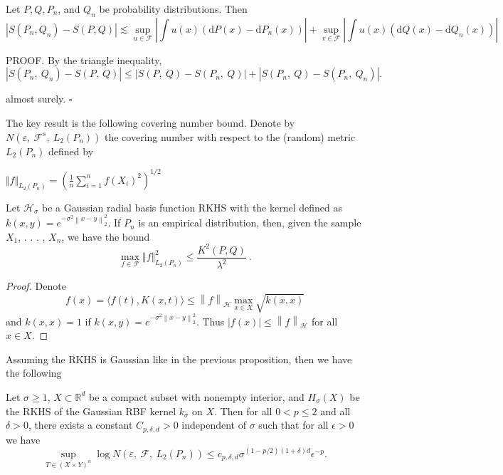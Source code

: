 	\begin{corollary}
		
		Let $P, Q, P_{n}$, and $Q_{n}$ be probability distributions. Then
		$$|S(P_{n}, Q_{n})-S(P, Q)| \lesssim \sup_{u\in \mathcal{F}}|\int u(x)(\mathrm{d}P(x)-\mathrm{d}P_{n}(x))|
		+\sup_{v\in \mathcal{F}}|\int u(x)(\mathrm{d}Q(x)-\mathrm{d}Q_{n}(x))|
		$$
	\end{corollary}
	
	PROOF. By the triangle inequality,
	$$|S(P_{n},\ Q_{n})-S(P,\ Q)|\leq|S(P,\ Q)-S(P_{n},\ Q)|+|S(P_{n},\ Q)-S(P_{n},\ Q_{n})|.$$
	
	almost surely. $\square $
	\medskip
	
	The key result is the following covering number bound. Denote by $N(\varepsilon,\ \mathcal{F}^{s},\ L_{2}(P_{n}))$ the covering number with respect to the (random) metric $L_{2}(P_{n})$ defined by
	
	$\displaystyle \Vert f\Vert_{L_{2}(P_{n})}=\left(\frac{1}{n}\sum_{i=1}^{n}f(X_{i})^{2}\right)^{1/2}$
	
	\begin{prop}
		Let $\mathcal{H}_{\sigma}$ be a Gaussian radial basis function RKHS with the kernel defined as $k(x,y)=e^{-\sigma^2 \left\|x-y\right\|_2^2}$. If $P_{n}$ is an empirical distribution, then, given the sample $X_{1}$, . . . , $X_{n}$, we have the bound
		$$
		\max_{f\in \mathcal{F}} \Vert f\Vert_{L_{2}(P_{n})}^{2}\leq \frac{K^2(P,Q)}{\lambda^2}\ .
		$$ 
	\end{prop}
	
	\begin{proof}
		Denote $$f(x)=\langle f(t),K(x,t)\rangle \leq \left\|f\right\|_{\mathcal{H}}\max_{x\in X} \sqrt{k(x,x)}$$ and $k(x,x)=1$ if $k(x,y)=e^{-\sigma^2 \left\|x-y\right\|_2^2}$. Thus $\left|f(x)\right|\leq \left\|f\right\|_{\mathcal{H}}$ for all $x\in X$.
	\end{proof}
	
	Assuming the RKHS is Gaussian like in the previous proposition, then we have the following
	\begin{theorem}
		Let $\sigma\geq 1$, $X\subset \mathbb{R}^d$ be a compact subset with nonempty interior, and $H_{\sigma}(X)$ be the RKHS of the Gaussian RBF kernel $k_{\sigma}$ on $X$. Then for all $0<p\leq 2$ and all $\delta>0$, there exists a constant $C_{p,\delta,d}>0$ independent of $\sigma$ such that for all $\epsilon>0$ we have 
		$$
		\sup_{T\in (X\times Y)^n} \log N(\varepsilon,\ \mathcal{F},\ L_{2}(P_{n}))\leq c_{p,\delta,d} \sigma^{(1-p/2)(1+\delta)d}\epsilon^{-p}.
		$$
	\end{theorem}
	
